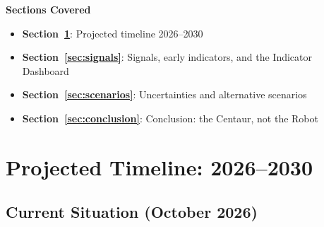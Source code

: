 \documentclass[11pt,letterpaper]{article}
\begin{document}
\vspace{0.8cm}
\begin{center}
\begin{minipage}{0.9\textwidth}
\begin{tcolorbox}[enhanced, colback=white, colframe=steelblue!40, boxrule=1pt, arc=4pt,
  left=15pt, right=15pt, top=12pt, bottom=12pt]
\textcolor{shadowdark}{\textbf{Sections Covered}}
\vspace{0.4em}
\begin{itemize}[nosep]
  \item \textbf{Section~\ref{sec:timeline}}: Projected timeline 2026--2030
  \item \textbf{Section~\ref{sec:signals}}: Signals, early indicators, and the Indicator Dashboard
  \item \textbf{Section~\ref{sec:scenarios}}: Uncertainties and alternative scenarios
  \item \textbf{Section~\ref{sec:conclusion}}: Conclusion: the Centaur, not the Robot
\end{itemize}
\end{tcolorbox}
\end{minipage}
\end{center}


\section{Projected Timeline: 2026--2030}\label{sec:timeline}

\subsection{Current Situation (October 2026)}
\end{document}
